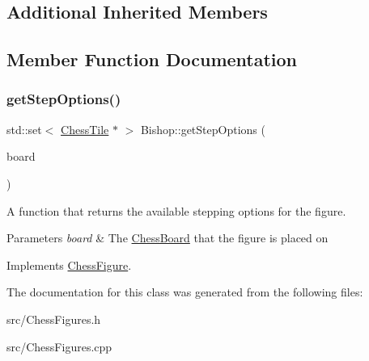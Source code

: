 \subsection*{Additional Inherited Members}


\subsection{Member Function Documentation}
\mbox{\label{classBishop_a5da898db86a3025a5064d2d6ea2f1148}} 
\subsubsection{\texorpdfstring{get\+Step\+Options()}{getStepOptions()}}
{\footnotesize\ttfamily std\+::set$<$ \mbox{\hyperlink{classChessTile}{Chess\+Tile}} $\ast$ $>$ Bishop\+::get\+Step\+Options (\begin{DoxyParamCaption}\item[{\mbox{\hyperlink{classChessBoard}{Chess\+Board}} \&}]{board }\end{DoxyParamCaption})\hspace{0.3cm}{\ttfamily [virtual]}}



A function that returns the available stepping options for the figure. 


\begin{DoxyParams}{Parameters}
{\em board} & The \mbox{\hyperlink{classChessBoard}{Chess\+Board}} that the figure is placed on \\
\hline
\end{DoxyParams}


Implements \mbox{\hyperlink{classChessFigure_ae78d52e35c4ea926f492d211c69758bd}{Chess\+Figure}}.



The documentation for this class was generated from the following files\+:\begin{DoxyCompactItemize}
\item 
src/Chess\+Figures.\+h\item 
src/Chess\+Figures.\+cpp\end{DoxyCompactItemize}
